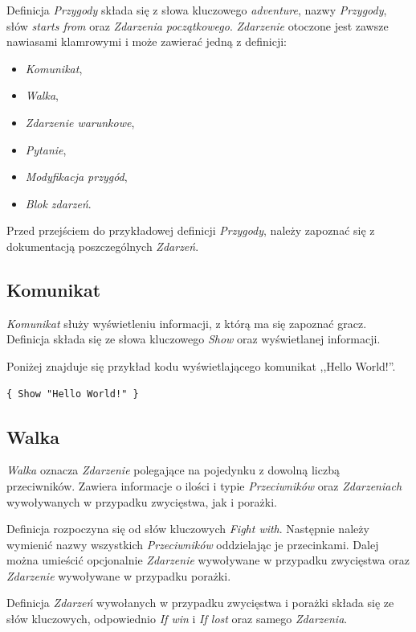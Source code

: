 \documentclass[openright]{xmgr}
\begin{document}
Definicja \textit{Przygody} składa się z słowa kluczowego \textit{adventure}, nazwy \textit{Przygody}, słów \textit{starts from} oraz \textit{Zdarzenia początkowego}. \textit{Zdarzenie} otoczone jest zawsze nawiasami klamrowymi i może zawierać jedną z definicji:
\begin{itemize}
	\item \textit{Komunikat},
	\item \textit{Walka},
	\item \textit{Zdarzenie warunkowe},
	\item \textit{Pytanie},
	\item \textit{Modyfikacja przygód},
	\item \textit{Blok zdarzeń}.
\end{itemize}

Przed przejściem do przykładowej definicji \textit{Przygody}, należy zapoznać się z dokumentacją poszczególnych \textit{Zdarzeń}.
\subsection*{Komunikat}
\textit{Komunikat} służy wyświetleniu informacji, z którą ma się zapoznać gracz. Definicja składa się ze słowa kluczowego \textit{Show} oraz wyświetlanej informacji.

Poniżej znajduje się przykład kodu wyświetlającego komunikat ,,Hello World!''.
\begin{verbatim}
{ Show "Hello World!" }
\end{verbatim}

\subsection*{Walka}
\textit{Walka} oznacza \textit{Zdarzenie} polegające na pojedynku z dowolną liczbą przeciwników. Zawiera informacje o ilości i typie \textit{Przeciwników} oraz \textit{Zdarzeniach} wywoływanych w przypadku zwycięstwa, jak i porażki.

Definicja rozpoczyna się od słów kluczowych \textit{Fight with}. Następnie należy wymienić nazwy wszystkich \textit{Przeciwników} oddzielając je przecinkami. Dalej można umieścić opcjonalnie \textit{Zdarzenie} wywoływane w przypadku zwycięstwa oraz \textit{Zdarzenie} wywoływane w przypadku porażki.

Definicja \textit{Zdarzeń} wywołanych w przypadku zwycięstwa i porażki składa się ze słów kluczowych, odpowiednio \textit{If win} i \textit{If lost} oraz samego \textit{Zdarzenia}.
\end{document}
